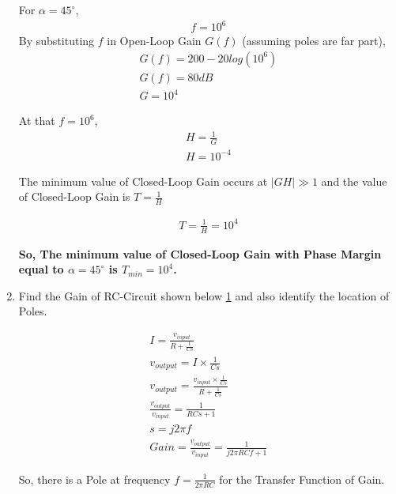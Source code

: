\begin{enumerate}[label=\thesubsection.\arabic*.,ref=\thesubsection.\theenumi]
For $\alpha=45^{\circ}$,
\begin{align}
f=10^{6}
\end{align}
By substituting $f$ in Open-Loop Gain $G(f)$ (assuming poles are far part), 
\begin{align}
G(f) = 200 - 20log(10^{6})\\
G(f) = 80 dB \\
G = 10^{4}
\end{align}

At that $f = 10^{6}$, 
\begin{align}
H = \frac{1}{G}\\
H = 10^{-4}
\end{align}

The minimum value of Closed-Loop Gain occurs at $|GH| \gg 1$ and the value of Closed-Loop Gain is $T=\frac{1}{H}$

\begin{align}
T = \frac{1}{H} = 10^{4}
\end{align}

\textbf{So, The minimum value of Closed-Loop Gain with Phase Margin equal to $\alpha=45^{\circ}$ is $T_{min} = 10^{4}$.}\\

\item Find the Gain of RC-Circuit shown below \ref{fig:RC Circuit} and also identify the location of Poles.
\begin{figure}[ht!]
	\begin{center}
		\resizebox{\columnwidth/2}{!}{}
	\end{center}
	\caption{}
	\label{fig:RC Circuit}
\end{figure}

\solution
\begin{align}
I = \frac{v_{input}}{R + \frac{1}{Cs}}\\
v_{output} = I \times \frac{1}{Cs}\\
v_{output} = \frac{v_{input} \times \frac{1}{Cs}}{R + \frac{1}{Cs}}\\
\frac{v_{output}}{v_{input}} = \frac{1}{RCs + 1}\\
s = j2\pi f\\
Gain = \frac{v_{output}}{v_{input}} = \frac{1}{j2\pi RCf + 1}
\end{align}

So, there is a Pole at frequency $f = \frac{1}{2\pi RC}$ for the Transfer Function of Gain.\\


\end{enumerate}
